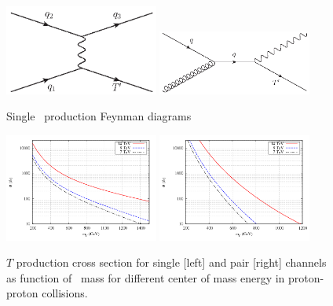 \begin{figure}[!Hhtbp]
  \begin{center}
    \includegraphics[width=0.45\textwidth]{figs/Tchannel_T_single.jpg}
    \includegraphics[width=0.45\textwidth]{figs/QuarkGluonFusion_SingleT.jpg}
    \caption{Single \Tp~production Feynman diagrams}
    \label{fig:ProdDiagSingle}
  \end{center}
\end{figure}

\begin{figure}[!Hhtbp]
  \begin{center}
    \includegraphics[width=0.45\textwidth]{figs/pheno_prod_single_tp.png}
    \includegraphics[width=0.45\textwidth]{figs/pheno_prod_pair_tp.png}
    \caption{$T$ production cross section for single [left] and pair [right] channels as function of \Tp~mass for different center of mass energy in proton-proton collisions.}
    \label{fig:TProdXS}
  \end{center}
\end{figure}

